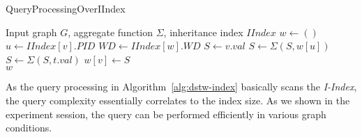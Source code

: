 \begin{algorithm}
\caption{QueryProcessingOverIIndex}
\begin{algorithmic}[1]
\Require Input graph $G$, aggregate function $\Sigma$, inheritance index $IIndex$ 
\State $w \leftarrow ()$
 \label{code:dstw-index-tp1}
	\State $u \leftarrow IIndex[v].PID$
	\State $WD \leftarrow IIndex[w].WD$
	\State $S \leftarrow v.val$
	\State $S \leftarrow \Sigma(S, w[u])$
	 \label{code:dstw-index-tp2}
		\State $S\leftarrow \Sigma(S, t.val)$
	\EndFor
	\State $w[v] \leftarrow S$
\EndFor \\
\Return $w$
\end{algorithmic}
\label{alg:dstw-index}
\end{algorithm}

As the query processing in Algorithm~\ref{alg:dstw-index} basically scans the \emph{I-Index}, the query
complexity essentially correlates to the index size. As we shown in the experiment session, the query can be performed efficiently 
in various graph conditions. 


